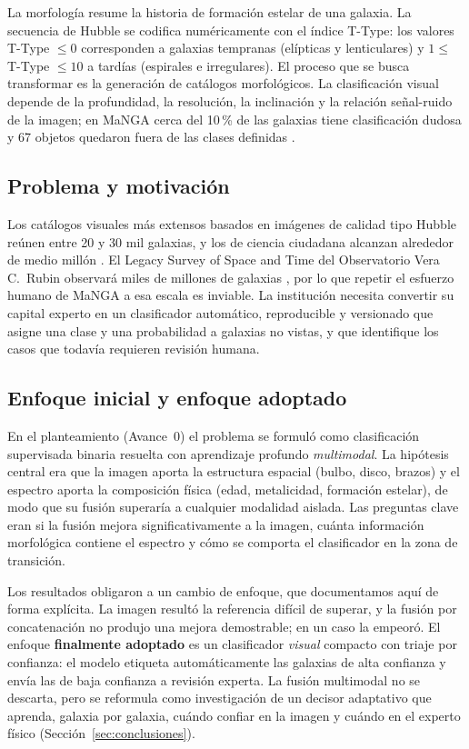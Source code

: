 \documentclass[letterpaper,11pt]{article}
\begin{document}
La morfología resume la historia de formación estelar de una galaxia. La secuencia de Hubble \parencite{hubble1926} se codifica numéricamente con el índice T-Type: los valores T-Type $\leq 0$ corresponden a galaxias tempranas (elípticas y lenticulares) y $1 \leq$ T-Type $\leq 10$ a tardías (espirales e irregulares). El proceso que se busca transformar es la generación de catálogos morfológicos. La clasificación visual depende de la profundidad, la resolución, la inclinación y la relación señal-ruido de la imagen; en MaNGA cerca del 10\,\% de las galaxias tiene clasificación dudosa y 67 objetos quedaron fuera de las clases definidas \parencite{vazquezmata2022}.

\subsection{Problema y motivación}
Los catálogos visuales más extensos basados en imágenes de calidad tipo Hubble reúnen entre 20 y 30 mil galaxias, y los de ciencia ciudadana alcanzan alrededor de medio millón \parencite{lintott2008}. El Legacy Survey of Space and Time del Observatorio Vera C.~Rubin observará miles de millones de galaxias \parencite{ivezic2019}, por lo que repetir el esfuerzo humano de MaNGA a esa escala es inviable. La institución necesita convertir su capital experto en un clasificador automático, reproducible y versionado que asigne una clase y una probabilidad a galaxias no vistas, y que identifique los casos que todavía requieren revisión humana.

\subsection{Enfoque inicial y enfoque adoptado}
En el planteamiento (Avance~0) el problema se formuló como clasificación supervisada binaria resuelta con aprendizaje profundo \emph{multimodal}. La hipótesis central era que la imagen aporta la estructura espacial (bulbo, disco, brazos) y el espectro aporta la composición física (edad, metalicidad, formación estelar), de modo que su fusión superaría a cualquier modalidad aislada. Las preguntas clave eran si la fusión mejora significativamente a la imagen, cuánta información morfológica contiene el espectro y cómo se comporta el clasificador en la zona de transición.

Los resultados obligaron a un cambio de enfoque, que documentamos aquí de forma explícita. La imagen resultó la referencia difícil de superar, y la fusión por concatenación no produjo una mejora demostrable; en un caso la empeoró. El enfoque \textbf{finalmente adoptado} es un clasificador \emph{visual} compacto con triaje por confianza: el modelo etiqueta automáticamente las galaxias de alta confianza y envía las de baja confianza a revisión experta. La fusión multimodal no se descarta, pero se reformula como investigación de un decisor adaptativo que aprenda, galaxia por galaxia, cuándo confiar en la imagen y cuándo en el experto físico (Sección~\ref{sec:conclusiones}).
\end{document}
